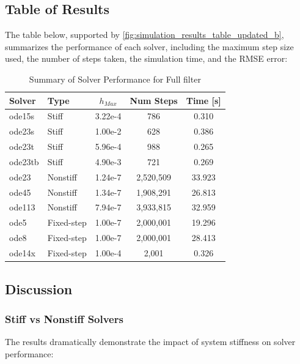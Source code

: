 \subsection*{Table of Results}
The table below, supported by \cref{fig:simulation_results_table_updated_b}, summarizes the performance of each solver, including the maximum step size used, the number of steps taken, the simulation time, and the RMSE error:

\begin{table}[h!]
    \centering
    \begin{tabular}{|l|l|c|c|c|}
        \hline
        \textbf{Solver} & \textbf{Type} & \textbf{$h_{Max}$} & \textbf{Num Steps} & \textbf{Time [s]} \\
        \hline
        ode15s & Stiff & 3.22e-4 & 786 & 0.310 \\
        ode23s & Stiff & 1.00e-2 & 628 & 0.386 \\
        ode23t & Stiff & 5.96e-4 & 988 & 0.265 \\
        ode23tb & Stiff & 4.90e-3 & 721 & 0.269 \\
        ode23 & Nonstiff & 1.24e-7 & 2,520,509 & 33.923 \\
        ode45 & Nonstiff & 1.34e-7 & 1,908,291 & 26.813 \\
        ode113 & Nonstiff & 7.94e-7 & 3,933,815 & 32.959 \\
        ode5 & Fixed-step & 1.00e-7 & 2,000,001 & 19.296 \\
        ode8 & Fixed-step & 1.00e-7 & 2,000,001 & 28.413 \\
        ode14x & Fixed-step & 1.00e-4 & 2,001 & 0.326 \\
        \hline
    \end{tabular}
    \caption{Summary of Solver Performance for Full filter }
    \label{tab:solver_performance_b}
\end{table}

\subsection*{Discussion}
\subsubsection*{Stiff vs Nonstiff Solvers}
The results dramatically demonstrate the impact of system stiffness on solver performance:

